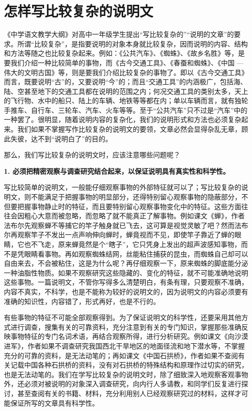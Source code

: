 \section{怎样写比较复杂的说明文}

《中学语文教学大纲》对高中一年级学生提出“写比较复杂的”“说明的文章”的要求。所谓“比较复杂”，是指要说明的对象本身就比较复杂，因而说明的内容、结构和方法等随之也比较复杂起来。例如：《公共汽车》、《蜘蛛》、《故乡名胜》等，是要我们介绍一种比较简单的事物，而《古今交通工具》、《春蚕和蜘蛛》、《中国 --- 伟大的文明古国》等，则是要我们介绍比较复杂的事物了。即以《古今交通工具》而言，既要说明“古”的，又要说明“今”的；而且“交通工具”的内涵极广，包括海、陆、空甚至地下的交通工具都在说明的范围之内；何况交通工具的类别太多，天上的飞行物、水中的船只、陆上的车辆、地铁等等都在内；单以车辆而言，就有独轮手推车、自行车、三轮车、汽车、火车等等。至于“公共汽车”只不过是“汽车”中的一种罢了。很明显，随着说明内容的复杂化，我们的说明形式和方法也必须复杂起来。我们如果不掌握写作比较复杂的说明文的要领，文章必然会显得杂乱无章，顾此失彼，达不到“说明白了”的目的。

那么，我们写比较复杂的说明文时，应该注意哪些问题呢？

\textbf{1. 必须把精密观察与调查研究结合起来，以保证说明具有真实性和科学性。}

写比较简单的说明文，一般能仔细观察事物的外部特征就可以了；写比较复杂的说明文，则不能满足于把握事物的明显部分，还得特别留心观察事物的隐蔽部分，不但要把握事物静止时的特征，而且要特别留心观察事物变化中的特征。这些方面往往会因粗心大意而被忽略，而忽略了就不能真正了解事物。例如课文《蝉》，作者法布尔先观察蝉不等捕它的竿子触身就已飞去，这可算是视觉灵敏了吧？然而法布尔再观察竿子不发出一点声响伸向蝉时，蝉竟视而不见，即使竿子靠近了蝉的眼睛，它也不飞走，原来蝉竟然是个“瞎子”，它只凭身上发出的超声波感知事物，而不是凭眼睛看事物。再如观察蜘蛛结网，丝能粘住捕获的昆虫，而蜘蛛自己却可以自由来去，不会被粘住，这是为什么呢？再仔细观察一下，原来蜘蛛的脚底能分泌一种油脂性物质。如果不观察研究这些隐藏的、变化的特征，就不可能准确地说明这些事物。一篇说明文，不管你写得多么清楚明白，有条有理，只要观察不准确，内容不真实，不科学，也是不能称为较好的说明文的，因为说明文的内容必须要有准确的知识性，内容错了，形式再好，也是不行的。

有些事物的特征不可能全部观察得到。为了保证说明文的科学性，还要采用其他方式进行调查，搜集有关的可靠资料，充分注意到有关的专门知识，掌握那些准确反映事物特征的专门名词术语，再结合观察所得，进行分析研究。例如课文《向沙漠进军》，作者如果不调查研究我国西北干旱地区的地面径流和地下潜水等，不掌握充分的可靠的资料，是无法动笔的；再如课文《中国石拱桥》，作者如果不查阅有关记载中国各种石拱桥的资料，没有对石拱桥的特殊结构和原理作过切实的研究，也是无法动笔的。我们在学写比较复杂的说明文时，除了细致深入地观察客观事物外，还必须对被说明的对象深入调查研究，向内行人多请教，和同学们反复进行探讨，甚至查阅有关的书籍、材料，充分利用别人已经观察研究过的材料，这样才可能保证所写的文章具有科学性。

